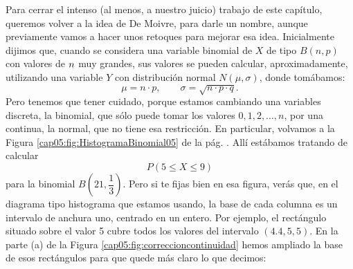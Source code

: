 Para cerrar el intenso (al menos, a nuestro juicio) trabajo de este capítulo, queremos volver a la idea de De Moivre, para darle un nombre, aunque previamente vamos a hacer unos retoques para mejorar esa idea. Inicialmente dijimos que, cuando se considera una variable binomial de $X$ de tipo $B(n,p)$ con valores de $n\emph{}$ muy grandes, sus valores se pueden calcular, aproximadamente, utilizando una variable $Y$ con distribución normal $N(\mu,\sigma)$, donde tomábamos:
    \[\mu=n\cdot p,\qquad \sigma=\sqrt{n\cdot p\cdot q}.\]
Pero tenemos que tener cuidado, porque estamos cambiando una variables discreta, la binomial, que sólo puede tomar los valores $0,1,2,\ldots,n$, por una continua, la normal, que no tiene esa restricción. En particular, volvamos a la Figura \ref{cap05:fig:HistogramaBinomial05} de la pág. \pageref{cap05:fig:HistogramaBinomial05}. Allí estábamos tratando de calcular
\[P(5\leq X\leq 9)\]
para la binomial $B\left(21,\dfrac{1}{3}\right)$. Pero si te fijas bien en esa figura, verás que, en el diagrama tipo histograma que estamos usando, la base de cada columna es un intervalo de anchura uno, centrado en un entero. Por ejemplo, el rectángulo situado sobre el valor 5 cubre todos los valores del intervalo $(4.4,5,5)$. En la parte (a) de la Figura \ref{cap05:fig:correccioncontinuidad} hemos ampliado la base de esos rectángulos para que quede más claro lo que decimos:

